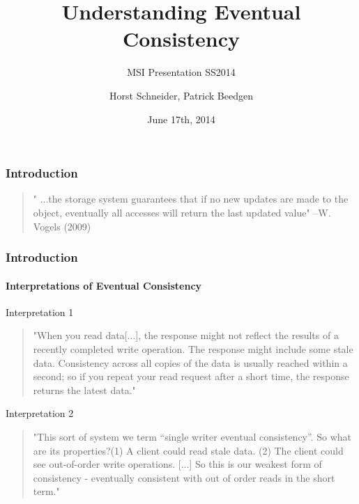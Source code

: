 \documentclass[11pt]{beamer}
\author{Horst Schneider, Patrick Beedgen}
\title{Understanding Eventual Consistency}
\subtitle{MSI Presentation SS2014}
\institute{Hochschule Mannheim}
\date{June 17th, 2014}
\begin{document}
\begin{frame}
\titlepage
\end{frame}

\begin{frame}
\frametitle{Introduction}
\begin{quotation}
" ...the 
storage system guarantees that if no 
new updates are made to the object, 
eventually all accesses will return the 
last updated value"
\linebreak
--W. Vogels (2009)
\end{quotation}
\end{frame}



\begin{frame}
\frametitle{Introduction}
\framesubtitle{Interpretations of Eventual Consistency}
\begin{footnotesize}

\begin{block}{Interpretation 1}
\begin{quotation}
"When you read data[...], the response might not reflect the results of a recently completed write operation. The response might include some stale data. Consistency across all copies of the data is usually reached within a second; so if you repeat your read request after a short time, the response returns the latest data."
\end{quotation}
\end{block}

\begin{block}{Interpretation 2}
\begin{quotation}
"This sort of system we term “single writer eventual consistency”.  So what are its properties?\linebreak (1) A client could read stale data. (2) The client could see out-of-order write operations. [...] So this is our weakest form of consistency - eventually consistent with out of order reads in the short term."
\end{quotation}
\end{block}
\end{footnotesize}
\end{frame}
\end{document}
